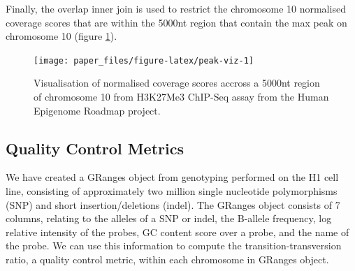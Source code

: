 \documentclass[10pt,letterpaper]{article}
\newenvironment{Shaded}{\begin{snugshade}}{\end{snugshade}}
\newcommand{\KeywordTok}[1]{\textcolor[rgb]{0.13,0.29,0.53}{\textbf{#1}}}
\newcommand{\DecValTok}[1]{\textcolor[rgb]{0.00,0.00,0.81}{#1}}
\newcommand{\StringTok}[1]{\textcolor[rgb]{0.31,0.60,0.02}{#1}}
\newcommand{\OperatorTok}[1]{\textcolor[rgb]{0.81,0.36,0.00}{\textbf{#1}}}
\newcommand{\NormalTok}[1]{#1}
\begin{document}
\begin{Shaded}
\end{Shaded}

Finally, the overlap inner join is used to restrict the chromosome 10
normalised coverage scores that are within the 5000nt region that
contain the max peak on chromosome 10 (figure \ref{fig:peak-viz}).

\begin{Shaded}
\end{Shaded}

\begin{figure}

{\centering \texttt{[image: paper\_files/figure-latex/peak-viz-1]} 

}

\caption{Visualisation of normalised coverage scores accross a 5000nt region of chromosome 10 from H3K27Me3 ChIP-Seq assay from the Human Epigenome Roadmap project.}\label{fig:peak-viz}
\end{figure}

\subsection{Quality Control Metrics}\label{quality-control-metrics}

We have created a GRanges object from genotyping performed on the H1
cell line, consisting of approximately two million single nucleotide
polymorphisms (SNP) and short insertion/deletions (indel). The GRanges
object consists of 7 columns, relating to the alleles of a SNP or indel,
the B-allele frequency, log relative intensity of the probes, GC content
score over a probe, and the name of the probe. We can use this
information to compute the transition-transversion ratio, a quality
control metric, within each chromosome in GRanges object.
\end{document}
